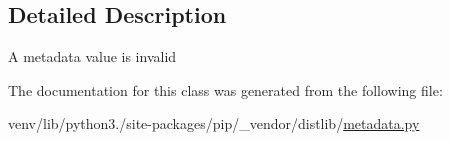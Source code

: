 \subsection{Detailed Description}
\begin{DoxyVerb}A metadata value is invalid\end{DoxyVerb}
 

The documentation for this class was generated from the following file\+:\begin{DoxyCompactItemize}
\item 
venv/lib/python3./site-\/packages/pip/\+\_\+vendor/distlib/\hyperlink{pip_2__vendor_2distlib_2metadata_8py}{metadata.\+py}\end{DoxyCompactItemize}
